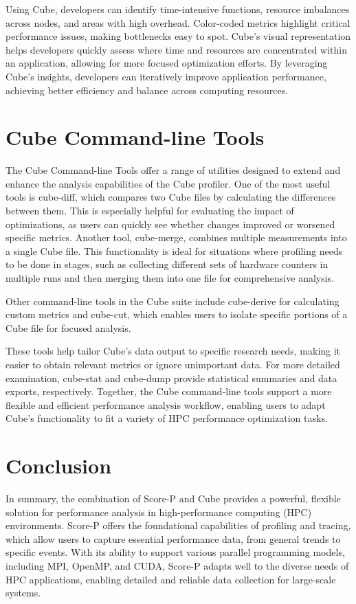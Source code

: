 \documentclass[conference]{IEEEtran}
\begin{document}
Using Cube, developers can identify time-intensive functions, resource imbalances across nodes, and areas with high overhead. Color-coded metrics highlight critical performance issues, making bottlenecks easy to spot. Cube’s visual representation helps developers quickly assess where time and resources are concentrated within an application, allowing for more focused optimization efforts. By leveraging Cube’s insights, developers can iteratively improve application performance, achieving better efficiency and balance across computing resources.

\section{Cube Command-line Tools}


The Cube Command-line Tools offer a range of utilities designed to extend and enhance the analysis capabilities of the Cube profiler. One of the most useful tools is cube-diff, which compares two Cube files by calculating the differences between them. This is especially helpful for evaluating the impact of optimizations, as users can quickly see whether changes improved or worsened specific metrics. Another tool, cube-merge, combines multiple measurements into a single Cube file. This functionality is ideal for situations where profiling needs to be done in stages, such as collecting different sets of hardware counters in multiple runs and then merging them into one file for comprehensive analysis.

Other command-line tools in the Cube suite include cube-derive for calculating custom metrics and cube-cut, which enables users to isolate specific portions of a Cube file for focused analysis. 

These tools help tailor Cube's data output to specific research needs, making it easier to obtain relevant metrics or ignore unimportant data. For more detailed examination, cube-stat and cube-dump provide statistical summaries and data exports, respectively. Together, the Cube command-line tools support a more flexible and efficient performance analysis workflow, enabling users to adapt Cube's functionality to fit a variety of HPC performance optimization tasks.

\section{Conclusion}

In summary, the combination of Score-P and Cube provides a powerful, flexible solution for performance analysis in high-performance computing (HPC) environments. Score-P offers the foundational capabilities of profiling and tracing, which allow users to capture essential performance data, from general trends to specific events. With its ability to support various parallel programming models, including MPI, OpenMP, and CUDA, Score-P adapts well to the diverse needs of HPC applications, enabling detailed and reliable data collection for large-scale systems.
\end{document}
